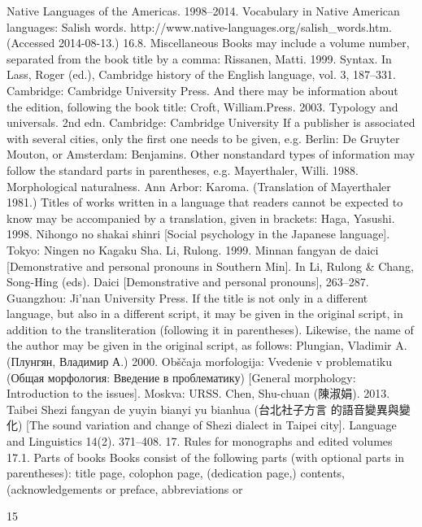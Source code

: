 Native Languages of the Americas. 1998–2014. Vocabulary in Native American languages: Salish words.
http://www.native-languages.org/salish\_words.htm. (Accessed 2014-08-13.)
16.8. Miscellaneous
Books may include a volume number, separated from the book title by a comma:
Rissanen, Matti. 1999. Syntax. In Lass, Roger (ed.), Cambridge history of the English language,
vol. 3, 187–331. Cambridge: Cambridge University Press.
And there may be information about the edition, following the book title:
Croft, William.Press.
2003. Typology and universals. 2nd edn. Cambridge: Cambridge University
If a publisher is associated with several cities, only the first one needs to be given,
e.g. Berlin: De Gruyter Mouton, or Amsterdam: Benjamins.
Other nonstandard types of information may follow the standard parts in
parentheses, e.g.
Mayerthaler, Willi. 1988. Morphological naturalness. Ann Arbor: Karoma. (Translation of
Mayerthaler 1981.)
Titles of works written in a language that readers cannot be expected to know may be
accompanied by a translation, given in brackets:
Haga, Yasushi. 1998. Nihongo no shakai shinri [Social psychology in the Japanese language].
Tokyo: Ningen no Kagaku Sha.
Li, Rulong. 1999. Minnan fangyan de daici [Demonstrative and personal pronouns in Southern
Min]. In Li, Rulong \& Chang, Song-Hing (eds). Daici [Demonstrative and personal
pronouns], 263–287. Guangzhou: Ji’nan University Press.
If the title is not only in a different language, but also in a different script, it may be given
in the original script, in addition to the transliteration (following it in parentheses).
Likewise, the name of the author may be given in the original script, as follows:
Plungian, Vladimir A. (Плунгян, Владимир А.) 2000. Obščaja morfologija: Vvedenie v problematiku
(Общая морфология: Введение в проблематику) [General morphology: Introduction to the
issues]. Moskva: URSS.
Chen, Shu-chuan (陳淑娟). 2013. Taibei Shezi fangyan de yuyin bianyi yu bianhua (台北社子方言
的語音變異與變化) [The sound variation and change of Shezi dialect in Taipei city]. Language
and Linguistics 14(2). 371–408.
17. Rules for monographs and edited volumes
17.1. Parts of books
Books consist of the following parts (with optional parts in parentheses): title page,
colophon page, (dedication page,) contents, (acknowledgements or preface, abbreviations or
	
 
 15	
  

